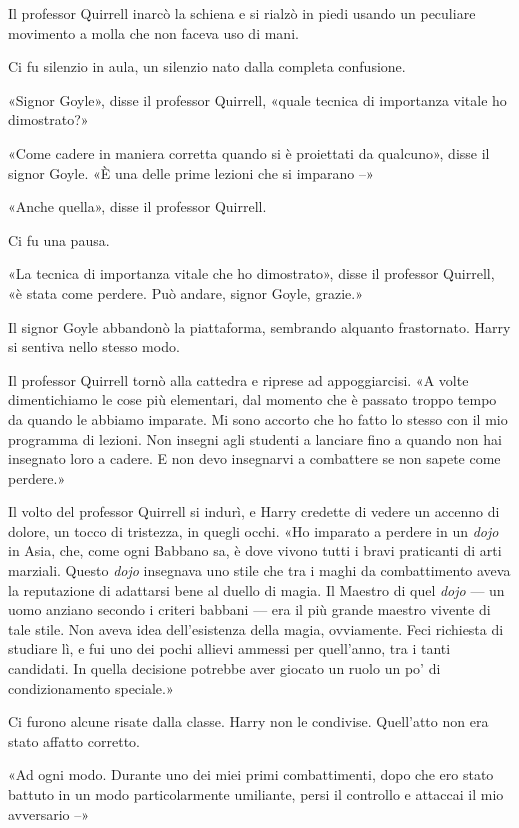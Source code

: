 Il professor Quirrell inarcò la schiena e si rialzò in piedi usando un peculiare movimento a molla che non faceva uso di mani.

Ci fu silenzio in aula, un silenzio nato dalla completa confusione.

«Signor Goyle», disse il professor Quirrell, «quale tecnica di importanza vitale ho dimostrato?»

«Come cadere in maniera corretta quando si è proiettati da qualcuno», disse il signor Goyle. «È una delle prime lezioni che si imparano –»

«Anche quella», disse il professor Quirrell.

Ci fu una pausa.

«La tecnica di importanza vitale che ho dimostrato», disse il professor Quirrell, «è stata come perdere. Può andare, signor Goyle, grazie.»

Il signor Goyle abbandonò la piattaforma, sembrando alquanto frastornato. Harry si sentiva nello stesso modo.

Il professor Quirrell tornò alla cattedra e riprese ad appoggiarcisi. «A volte dimentichiamo le cose più elementari, dal momento che è passato troppo tempo da quando le abbiamo imparate. Mi sono accorto che ho fatto lo stesso con il mio programma di lezioni. Non insegni agli studenti a lanciare fino a quando non hai insegnato loro a cadere. E non devo insegnarvi a combattere se non sapete come perdere.»

Il volto del professor Quirrell si indurì, e Harry credette di vedere un accenno di dolore, un tocco di tristezza, in quegli occhi. «Ho imparato a perdere in un \textit{dojo} in Asia, che, come ogni Babbano sa, è dove vivono tutti i bravi praticanti di arti marziali. Questo \textit{dojo} insegnava uno stile che tra i maghi da combattimento aveva la reputazione di adattarsi bene al duello di magia. Il Maestro di quel \textit{dojo} — un uomo anziano secondo i criteri babbani — era il più grande maestro vivente di tale stile. Non aveva idea dell’esistenza della magia, ovviamente. Feci richiesta di studiare lì, e fui uno dei pochi allievi ammessi per quell’anno, tra i tanti candidati. In quella decisione potrebbe aver giocato un ruolo un po’ di condizionamento speciale.»

Ci furono alcune risate dalla classe. Harry non le condivise. Quell’atto non era stato affatto corretto.

«Ad ogni modo. Durante uno dei miei primi combattimenti, dopo che ero stato battuto in un modo particolarmente umiliante, persi il controllo e attaccai il mio avversario –»


